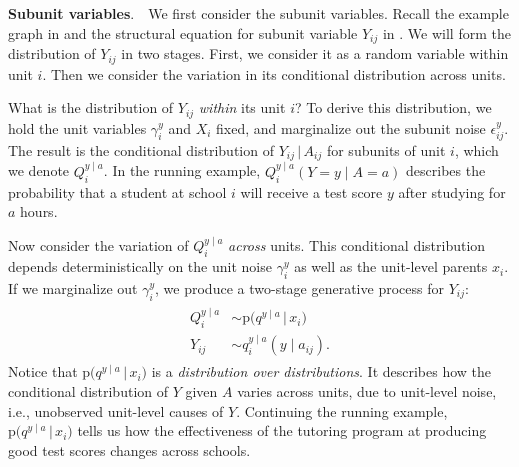\documentclass[12pt]{article}
\newcommand{\g}{\,\vert\,}
\newcommand{\pr}{\mathrm{p}}
\newcommand{\parhead}[1]{\vspace{0.1in} \noindent \textbf{#1}. \,\,}
\begin{document}
\parhead{Subunit variables} We first consider the subunit variables. Recall the example graph in  and the structural equation for subunit variable $Y_{ij}$ in . We will form the distribution of $Y_{ij}$ in two stages. First, we consider it as a random variable within unit $i$. Then we consider the variation in its conditional distribution across units.



What is the distribution of $Y_{ij}$ \textit{within} its unit $i$? To derive this distribution, we hold the unit variables $\gamma_i^{y}$ and $X_i$ fixed, and marginalize out the subunit noise $\epsilon_{ij}^{y}$. The result is the conditional distribution of $Y_{ij} \g A_{ij}$ for subunits of unit $i$, which we denote $Q_i^{y \mid a}$.  In the running example, $Q_i^{y \mid a}(Y=y \mid A=a)$ describes the probability that a student at school $i$ will receive a test score $y$ after studying for $a$ hours.

Now consider the variation of $Q_i^{y \mid a}$ \textit{across} units. This conditional distribution depends deterministically on the unit noise $\gamma_i^{y}$ as well as the unit-level parents $x_i$.  If we marginalize out $\gamma_i^{y}$, we produce a two-stage generative process for $Y_{ij}$:
\begin{align}
  \label{eqn:hcgm_subunit} \begin{split}
    Q_i^{y \mid a} &\sim \pr\big (q^{y \mid a}\, \big|\, x_i\big) \\
    Y_{ij} &\sim q_i^{y \mid a}(y \mid a_{ij}).
  \end{split}
\end{align}
Notice that $\pr\big (q^{y \mid a}\, \big|\, x_i\big)$ is a
\textit{distribution over distributions}.  It describes how the
conditional distribution of $Y$ given $A$ varies across units, due to
unit-level noise, i.e., unobserved unit-level causes of $Y$.
Continuing the running example,
$\pr\big (q^{y \mid a}\, \big|\, x_i\big)$ tells us how the effectiveness
of the tutoring program at producing good test scores changes across
schools.
\end{document}
